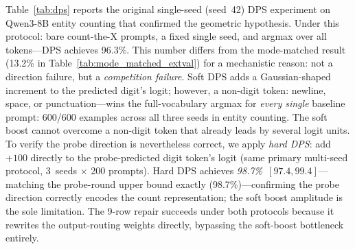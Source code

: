 \documentclass{article}
\begin{document}
Table~\ref{tab:dps} reports the original single-seed (seed~42) DPS experiment on Qwen3-8B entity counting
that confirmed the geometric hypothesis.
Under this protocol: bare count-the-X prompts, a fixed single seed, and argmax over all tokens---DPS achieves 96.3\%.
This number differs from the mode-matched result (13.2\% in Table~\ref{tab:mode_matched_extval}) for a mechanistic reason:
not a direction failure, but a \emph{competition failure}.
Soft DPS adds a Gaussian-shaped increment to the predicted digit's logit;
however, a non-digit token: newline, space, or punctuation---wins the full-vocabulary argmax
for \emph{every single} baseline prompt: 600/600 examples across all three seeds in entity counting.
The soft boost cannot overcome a non-digit token that already leads by several logit units.
To verify the probe direction is nevertheless correct, we apply \emph{hard DPS}: add $+100$ directly
to the probe-predicted digit token's logit (same primary multi-seed protocol, 3~seeds $\times$ 200 prompts).
Hard DPS achieves \emph{98.7\%}~$[97.4, 99.4]$---matching the probe-round upper bound exactly (98.7\%)---confirming
the probe direction correctly encodes the count representation; the soft boost amplitude is the sole limitation.
The 9-row repair succeeds under both protocols because it rewrites the output-routing weights directly,
bypassing the soft-boost bottleneck entirely.
\end{document}
